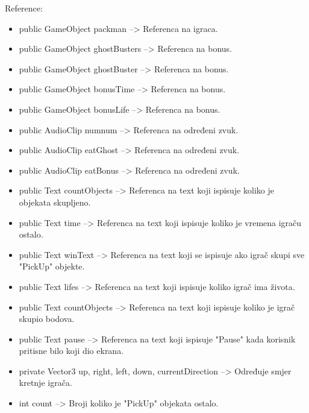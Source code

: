 Reference:

\begin{itemize}
\item public GameObject packman --> Referenca na igraca.

\item public GameObject ghostBusters --> Referenca na bonus.

\item public GameObject ghostBuster --> Referenca na bonus.

\item public GameObject bonusTime --> Referenca na bonus.

\item public GameObject bonusLife --> Referenca na bonus.

\item public AudioClip numnum --> Referenca na određeni zvuk.

\item public AudioClip eatGhost --> Referenca na određeni zvuk.

\item public AudioClip eatBonus --> Referenca na određeni zvuk.

\item public Text countObjects --> Referenca na text koji ispisuje koliko je objekata skupljeno.

\item public Text time --> Referenca na text koji ispisuje koliko je vremena igraču ostalo.

\item public Text winText --> Referenca na text koji se ispisuje ako igrač skupi sve "PickUp" objekte.

\item public Text lifes --> Referenca na text koji ispisuje koliko igrač ima života.

\item public Text countObjects --> Referenca na text koji ispisuje koliko je igrač skupio bodova.

\item public Text pause --> Referenca na text koji ispisuje "Pause" kada korisnik pritisne bilo koji dio ekrana.

\item private Vector3 up, right, left, down, currentDirection --> Određuje smjer kretnje igrača.

\item int count --> Broji koliko je "PickUp" objekata ostalo.


\end{itemize}
